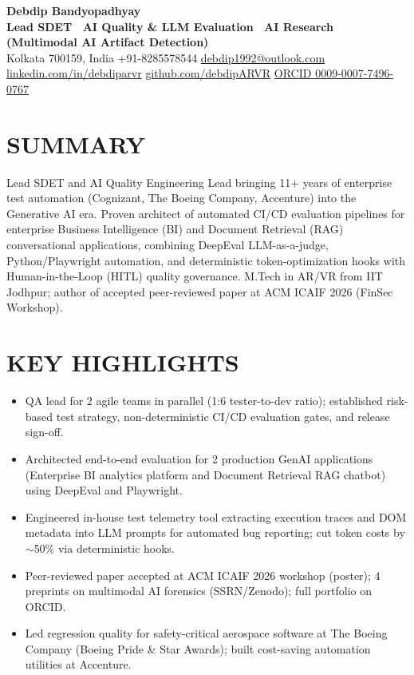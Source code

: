 \documentclass[10pt,a4paper]{article}
\begin{document}
\begin{center}
    {\Large \textbf{Debdip Bandyopadhyay}}\\[2pt]
    {\small \textbf{\color{accent}Lead SDET \textbar\ AI Quality \& LLM Evaluation \textbar\ AI Research (Multimodal AI Artifact Detection)}}\\[2pt]
    \footnotesize Kolkata 700159, India \enspace\textbar\enspace +91-8285578544 \enspace\textbar\enspace \href{mailto:debdip1992@outlook.com}{debdip1992@outlook.com} \enspace\textbar\enspace \href{https://linkedin.com/in/debdiparvr}{linkedin.com/in/debdiparvr} \enspace\textbar\enspace \href{https://github.com/debdipARVR}{github.com/debdipARVR} \enspace\textbar\enspace \href{https://orcid.org/0009-0007-7496-0767}{ORCID 0009-0007-7496-0767}
\end{center}

\vspace{-4pt}

\section{SUMMARY}
\footnotesize
Lead SDET and AI Quality Engineering Lead bringing 11+ years of enterprise test automation (Cognizant, The Boeing Company, Accenture) into the Generative AI era. Proven architect of automated CI/CD evaluation pipelines for enterprise Business Intelligence (BI) and Document Retrieval (RAG) conversational applications, combining DeepEval LLM-as-a-judge, Python/Playwright automation, and deterministic token-optimization hooks with Human-in-the-Loop (HITL) quality governance. M.Tech in AR/VR from IIT Jodhpur; author of accepted peer-reviewed paper at ACM ICAIF 2026 (FinSec Workshop).

\section{KEY HIGHLIGHTS}
\footnotesize
\begin{itemize}[leftmargin=*,noitemsep,topsep=1pt]
    \item QA lead for 2 agile teams in parallel (1:6 tester-to-dev ratio); established risk-based test strategy, non-deterministic CI/CD evaluation gates, and release sign-off.
    \item Architected end-to-end evaluation for 2 production GenAI applications (Enterprise BI analytics platform and Document Retrieval RAG chatbot) using DeepEval and Playwright.
    \item Engineered in-house test telemetry tool extracting execution traces and DOM metadata into LLM prompts for automated bug reporting; cut token costs by $\sim$50\% via deterministic hooks.
    \item Peer-reviewed paper accepted at ACM ICAIF 2026 workshop (poster); 4 preprints on multimodal AI forensics (SSRN/Zenodo); full portfolio on ORCID.
    \item Led regression quality for safety-critical aerospace software at The Boeing Company (Boeing Pride \& Star Awards); built cost-saving automation utilities at Accenture.
\end{itemize}
\end{document}
